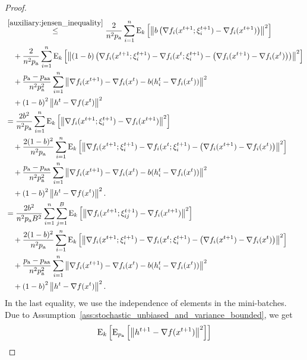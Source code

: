 \documentclass{article}
\newcommand*{\probavailable}{\ensuremath{p_{\textnormal{a}}}}
\newcommand*{\probpairaa}{\ensuremath{p_{\textnormal{aa}}}}
\begin{document}
\begin{proof}
\begin{align*}
    &\overset{\eqref{auxiliary:jensen_inequality}}{\leq} \frac{2}{n^2 \probavailable}\sum_{i=1}^n \ExpSub{k}{\norm{b \left(\nabla f_i(x^{t+1};\xi^{t+1}_i) - \nabla f_i(x^{t+1})\right)}^2} \\
    & \quad + \frac{2}{n^2 \probavailable}\sum_{i=1}^n \ExpSub{k}{\norm{(1 - b)\left(\nabla f_i(x^{t+1};\xi^{t+1}_i) - \nabla f_i(x^{t};\xi^{t+1}_i) - \left(\nabla f_i(x^{t+1}) - \nabla f_i(x^{t})\right)\right)}^2} \\
    &\quad + \frac{\probavailable - \probpairaa}{n^2 \probavailable^2} \sum_{i=1}^n \norm{\nabla f_i(x^{t+1}) - \nabla f_i(x^{t}) - b(h^t_i - \nabla f_i(x^{t}))}^2 \\
    &\quad + \left(1 - b\right)^2 \norm{h^{t} - \nabla f(x^{t})}^2 \\
    &= \frac{2 b^2}{n^2 \probavailable}\sum_{i=1}^n \ExpSub{k}{\norm{\nabla f_i(x^{t+1};\xi^{t+1}_i) - \nabla f_i(x^{t+1})}^2} \\
    & \quad + \frac{2 (1 - b)^2}{n^2 \probavailable}\sum_{i=1}^n \ExpSub{k}{\norm{\nabla f_i(x^{t+1};\xi^{t+1}_i) - \nabla f_i(x^{t};\xi^{t+1}_i) - \left(\nabla f_i(x^{t+1}) - \nabla f_i(x^{t})\right)}^2} \\
    &\quad + \frac{\probavailable - \probpairaa}{n^2 \probavailable^2} \sum_{i=1}^n \norm{\nabla f_i(x^{t+1}) - \nabla f_i(x^{t}) - b(h^t_i - \nabla f_i(x^{t}))}^2 \\
    &\quad + \left(1 - b\right)^2 \norm{h^{t} - \nabla f(x^{t})}^2. \\
    &= \frac{2 b^2}{n^2 \probavailable B^2}\sum_{i=1}^n \sum_{j=1}^B \ExpSub{k}{\norm{\nabla f_i(x^{t+1};\xi^{t+1}_{ij}) - \nabla f_i(x^{t+1})}^2} \\
    & \quad + \frac{2 (1 - b)^2}{n^2 \probavailable}\sum_{i=1}^n \ExpSub{k}{\norm{\nabla f_i(x^{t+1};\xi^{t+1}_i) - \nabla f_i(x^{t};\xi^{t+1}_i) - \left(\nabla f_i(x^{t+1}) - \nabla f_i(x^{t})\right)}^2} \\
    &\quad + \frac{\probavailable - \probpairaa}{n^2 \probavailable^2} \sum_{i=1}^n \norm{\nabla f_i(x^{t+1}) - \nabla f_i(x^{t}) - b(h^t_i - \nabla f_i(x^{t}))}^2 \\
    &\quad + \left(1 - b\right)^2 \norm{h^{t} - \nabla f(x^{t})}^2.
  \end{align*}
  In the last equality, we use the independence of elements in the mini-batches. Due to Assumption~\ref{ass:stochastic_unbiased_and_variance_bounded}, we get
  \begin{align*}
    &\ExpSub{k}{\ExpSub{\probavailable}{\norm{h^{t+1} - \nabla f(x^{t+1})}^2}} \\

\end{align*}
\end{proof}
\end{document}
